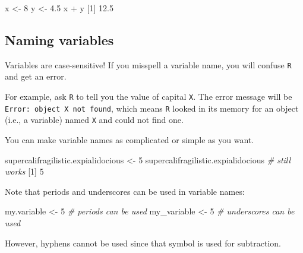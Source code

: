 \documentclass[
]{book}
\newenvironment{Shaded}{\begin{snugshade}}{\end{snugshade}}
\newcommand{\CommentTok}[1]{\textcolor[rgb]{0.56,0.35,0.01}{\textit{#1}}}
\newcommand{\DecValTok}[1]{\textcolor[rgb]{0.00,0.00,0.81}{#1}}
\newcommand{\FloatTok}[1]{\textcolor[rgb]{0.00,0.00,0.81}{#1}}
\newcommand{\NormalTok}[1]{#1}
\newcommand{\OtherTok}[1]{\textcolor[rgb]{0.56,0.35,0.01}{#1}}
\newcommand{\SpecialCharTok}[1]{\textcolor[rgb]{0.00,0.00,0.00}{#1}}
\begin{document}
\begin{Shaded}
\begin{Highlighting}[]
\NormalTok{x }\OtherTok{\textless{}{-}} \DecValTok{8}
\NormalTok{y }\OtherTok{\textless{}{-}} \FloatTok{4.5}
\NormalTok{x }\SpecialCharTok{+}\NormalTok{ y}
\NormalTok{[}\DecValTok{1}\NormalTok{] }\FloatTok{12.5}
\end{Highlighting}
\end{Shaded}

\hypertarget{naming-variables}{%
\subsection*{Naming variables}\label{naming-variables}}

Variables are case-sensitive! If you misspell a variable name, you will confuse \texttt{R} and get an error.

For example, ask \texttt{R} to tell you the value of capital \texttt{X}. The error message will be \texttt{Error:\ object\ \textquotesingle{}X\textquotesingle{}\ not\ found}, which means \texttt{R} looked in its memory for an object (i.e., a variable) named \texttt{X} and could not find one.

You can make variable names as complicated or simple as you want.

\begin{Shaded}
\begin{Highlighting}[]
\NormalTok{supercalifragilistic.expialidocious }\OtherTok{\textless{}{-}} \DecValTok{5}
\NormalTok{supercalifragilistic.expialidocious  }\CommentTok{\# still works}
\NormalTok{[}\DecValTok{1}\NormalTok{] }\DecValTok{5}
\end{Highlighting}
\end{Shaded}

Note that periods and underscores can be used in variable names:

\begin{Shaded}
\begin{Highlighting}[]
\NormalTok{my.variable }\OtherTok{\textless{}{-}} \DecValTok{5} \CommentTok{\# periods can be used}
\NormalTok{my\_variable }\OtherTok{\textless{}{-}} \DecValTok{5} \CommentTok{\# underscores can be used}
\end{Highlighting}
\end{Shaded}

However, hyphens cannot be used since that symbol is used for subtraction.
\end{document}
